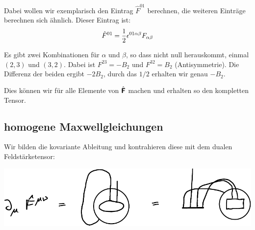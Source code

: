 Dabei wollen wir exemplarisch den Eintrag $\hat F^{01}$ berechnen, die weiteren
Einträge berechnen sich ähnlich. Dieser Eintrag ist:
\[
	\hat F^{01} = \frac 12 \epsilon^{01\alpha\beta} F_{\alpha\beta}
\]

Es gibt zwei Kombinationen für $\alpha$ und $\beta$, so dass nicht null
herauskommt, einmal $(2, 3)$ und $(3, 2)$. Dabei ist $F^{23} = -B_2$ und
$F^{32} = B_2$ (Antisymmetrie). Die Differenz der beiden ergibt $-2 B_2$, durch
das $1/2$ erhalten wir genau $-B_2$.

Dies können wir für alle Elemente von $\hat{\boldsymbol{\mathsf{F}}}$ machen und erhalten so
den kompletten Tensor.

\subsection{homogene Maxwellgleichungen}

Wir bilden die kovariante Ableitung und kontrahieren diese mit dem dualen
Feldstärketensor:
\begin{center}
	\includegraphics{H1-Penrose-6-crop.pdf}
\end{center}

